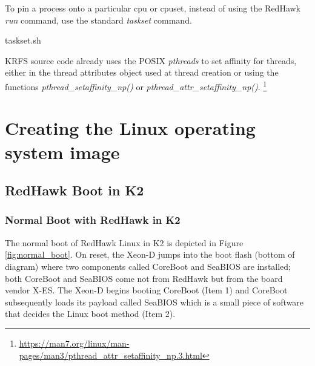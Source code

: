\documentclass[12pt]{article}
\begin{document}
To pin a process onto a particular cpu or cpuset, instead of using the RedHawk
\emph{run} command, use the standard \emph{taskset} command.

\vspace{0.8cm}
\lstset{
    language=bash,
    basicstyle=\footnotesize\ttfamily,
    linewidth=6in,
    showstringspaces=false,
    keywordstyle=\ttfamily
}
\begin{adjustwidth}{0.0in}{0.0in}
\begin{lstinputlisting}[caption={Use taskset instead of run},
label={lst:taskset_cmd}]{taskset.sh}

\end{lstinputlisting}
\end{adjustwidth}
\vspace{0.8cm}

KRFS source code already uses the POSIX \emph{pthreads} to set affinity for
threads, either in the thread attributes object used at thread creation or using
the functions \emph{pthread\_setaffinity\_np()} or
\emph{pthread\_attr\_setaffinity\_np()}.%
\footnote{\url{https://man7.org/linux/man-pages/man3/pthread_attr_setaffinity_np.3.html}}


%
\newpage
\section{Creating the Linux operating system image}
\label{sec:image_creation}


\subsection{RedHawk Boot in K2}

\subsubsection{Normal Boot with RedHawk in K2}
The normal boot of RedHawk Linux in K2 is depicted in Figure \ref{fig:normal_boot}.
On reset, the Xeon-D jumps into the boot flash (bottom of diagram) where two
components called CoreBoot and SeaBIOS are installed; both CoreBoot and SeaBIOS
come not from RedHawk but from the board vendor X-ES.  The Xeon-D begins
booting CoreBoot (Item 1) and CoreBoot subsequently loads its payload called
SeaBIOS which is a small piece of software that decides the Linux boot method
(Item 2).
\end{document}
